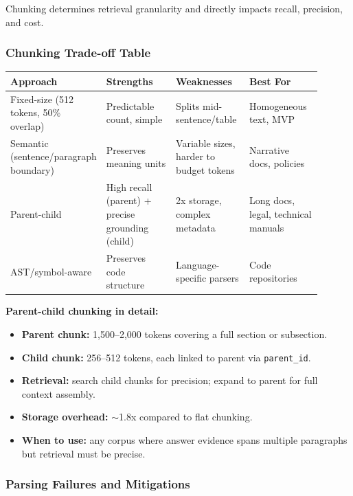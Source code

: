 Chunking determines retrieval granularity and directly impacts recall, precision, and cost.

\subsubsection*{Chunking Trade-off Table}

\small
\begin{tabular}{|p{0.18\linewidth}|p{0.24\linewidth}|p{0.24\linewidth}|p{0.24\linewidth}|}
\hline
\textbf{Approach} & \textbf{Strengths} & \textbf{Weaknesses} & \textbf{Best For} \\
\hline
Fixed-size (512 tokens, 50\% overlap) & Predictable count, simple & Splits mid-sentence/table & Homogeneous text, MVP \\
\hline
Semantic (sentence/paragraph boundary) & Preserves meaning units & Variable sizes, harder to budget tokens & Narrative docs, policies \\
\hline
Parent-child & High recall (parent) + precise grounding (child) & 2x storage, complex metadata & Long docs, legal, technical manuals \\
\hline
AST/symbol-aware & Preserves code structure & Language-specific parsers & Code repositories \\
\hline
\end{tabular}
\normalsize

\textbf{Parent-child chunking in detail:}

\begin{itemize}
  \item \textbf{Parent chunk:} 1,500--2,000 tokens covering a full section or subsection.
  \item \textbf{Child chunk:} 256--512 tokens, each linked to parent via \texttt{parent\_id}.
  \item \textbf{Retrieval:} search child chunks for precision; expand to parent for full context assembly.
  \item \textbf{Storage overhead:} $\sim$1.8x compared to flat chunking.
  \item \textbf{When to use:} any corpus where answer evidence spans multiple paragraphs but retrieval must be precise.
\end{itemize}

\subsubsection*{Parsing Failures and Mitigations}

